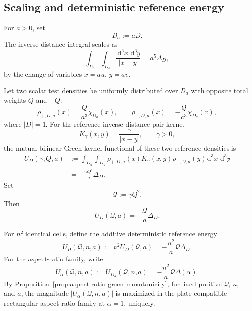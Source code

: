 \documentclass[11pt]{article}
\newcommand{\dd}{\,\mathrm{d}}
\begin{document}
\subsection{Scaling and deterministic reference energy}

For \(a>0\), set
\[
    D_a:=aD.
\]
The inverse-distance integral scales as
\begin{equation}
    \int_{D_a}\int_{D_a}\frac{\dd^3x\,\dd^3y}{|x-y|}
    =
    a^5\Delta_D,
    \label{eq:reference-delta-scaling}
\end{equation}
by the change of variables \(x=au\), \(y=av\).

Let two scalar test densities be uniformly distributed over \(D_a\) with
opposite total weights \(Q\) and \(-Q\):
\[
    \rho_{+,D,a}(x)=\frac{Q}{a^3}\chi_{D_a}(x),
    \qquad
    \rho_{-,D,a}(x)=-\frac{Q}{a^3}\chi_{D_a}(x),
\]
where \(|D|=1\).  For the reference inverse-distance pair kernel
\[
    K_\gamma(x,y)=\frac{\gamma}{|x-y|},
    \qquad
    \gamma>0,
\]
the mutual bilinear Green-kernel functional of these two reference densities
is
\begin{equation}
\begin{split}
    U_D(\gamma,Q,a)
    &:=
    \int_{D_a}\int_{D_a}
    \rho_{+,D,a}(x)K_\gamma(x,y)\rho_{-,D,a}(y)
    \dd^3x\,\dd^3y                                      \\
    &=
    -\frac{\gamma Q^2}{a}\Delta_D.
\end{split}
    \label{eq:reference-cell-energy}
\end{equation}
Set
\[
    \mathcal Q:=\gamma Q^2.
\]
Then
\begin{equation}
    U_D(\mathcal Q,a)
    =
    -\frac{\mathcal Q}{a}\Delta_D.
    \label{eq:reference-cell-energy-Qcal}
\end{equation}

For \(n^2\) identical cells, define the additive deterministic reference
energy
\begin{equation}
    U_D(\mathcal Q,n,a)
    :=
    n^2U_D(\mathcal Q,a)
    =
    -\frac{n^2}{a}\mathcal Q\Delta_D.
    \label{eq:reference-n2-cell-energy}
\end{equation}
For the aspect-ratio family, write
\begin{equation}
    U_\alpha(\mathcal Q,n,a)
    :=
    U_{D_\alpha}(\mathcal Q,n,a)
    =
    -\frac{n^2}{a}\mathcal Q\Delta(\alpha).
    \label{eq:aspect-reference-energy}
\end{equation}
By Proposition~\ref{prop:aspect-ratio-green-monotonicity}, for fixed
positive \(\mathcal Q\), \(n\), and \(a\), the magnitude
\(|U_\alpha(\mathcal Q,n,a)|\) is maximized in the plate-compatible
rectangular aspect-ratio family at \(\alpha=1\), uniquely.
\end{document}
